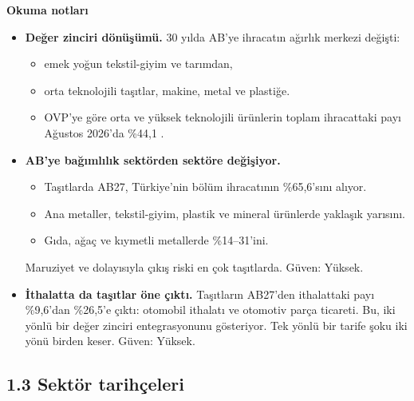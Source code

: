 \textbf{Okuma notları}

\begin{itemize}
\item
  \textbf{Değer zinciri dönüşümü.} 30 yılda AB'ye ihracatın ağırlık merkezi değişti:

  \begin{itemize}
  \tightlist
  \item
    emek yoğun tekstil-giyim ve tarımdan,
  \item
    orta teknolojili taşıtlar, makine, metal ve plastiğe.
  \item
    OVP'ye göre orta ve yüksek teknolojili ürünlerin toplam ihracattaki payı Ağustos 2026'da \%44,1 \etiketV{}.
  \end{itemize}
\item
  \textbf{AB'ye bağımlılık sektörden sektöre değişiyor.}

  \begin{itemize}
  \tightlist
  \item
    Taşıtlarda AB27, Türkiye'nin bölüm ihracatının \%65,6'sını alıyor.
  \item
    Ana metaller, tekstil-giyim, plastik ve mineral ürünlerde yaklaşık yarısını.
  \item
    Gıda, ağaç ve kıymetli metallerde \%14--31'ini.
  \end{itemize}

  Maruziyet ve dolayısıyla çıkış riski en çok taşıtlarda. \etiketV{} Güven: Yüksek.
\item
  \textbf{İthalatta da taşıtlar öne çıktı.} Taşıtların AB27'den ithalattaki payı \%9,6'dan \%26,5'e çıktı: otomobil ithalatı ve otomotiv parça ticareti. Bu, iki yönlü bir değer zinciri entegrasyonunu gösteriyor. Tek yönlü bir tarife şoku iki yönü birden keser. \etiketV{} Güven: Yüksek.
\end{itemize}

\hypertarget{01_teshis-13-sektuxf6r-tarihuxe7eleri}{%
\subsection{1.3 Sektör tarihçeleri}\label{01_teshis-13-sektuxf6r-tarihuxe7eleri}}

\begingroup\gbtablo\footnotesize

